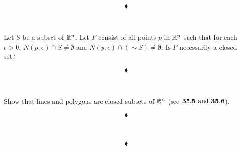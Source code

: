 $$\blacklozenge$$\\

\subsection{}
\begin{tcolorbox}
Let $S$ be a subset of $\mathbb{R}^n$. Let $F$ consist of all points $p$ in $\mathbb{R}^n$ such that for each $\epsilon > 0, \, N(p; \epsilon)\cap S \neq \emptyset$ and $N(p;\epsilon)\cap \left(
\sim S\right)  \neq \emptyset$. Is $F$ necessarily a closed set?
\end{tcolorbox}

$$\blacklozenge$$\\

\subsection{}
\begin{tcolorbox}
Show that lines and polygons are closed subsets of $\mathbb{R}^n$ (see $\mathbf{35.5}\text{ and } \mathbf{ 35.6}$).
\end{tcolorbox}

$$\blacklozenge$$\\

\newpage


\renewcommand{\thesubsection}{\thesection.\arabic{subsection}}
\setcounter{subsection}{0}

\subsection{}
\begin{tcolorbox}

\end{tcolorbox}

$$\blacklozenge$$\\


\subsection{}
\begin{tcolorbox}

\end{tcolorbox}

